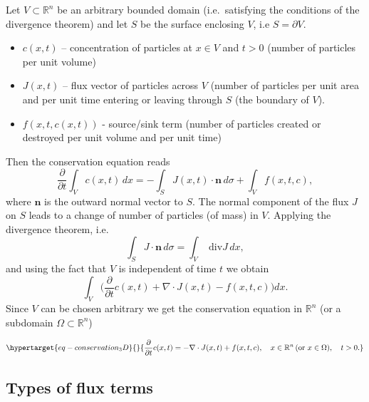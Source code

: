 \documentclass[
  letterpaper,
  DIV=11,
  numbers=noendperiod]{scrreprt}
\providecommand{\tightlist}{%
  \setlength{\itemsep}{0pt}\setlength{\parskip}{0pt}}\usepackage{longtable,booktabs,array}
\theoremstyle{plain}
\theoremstyle{definition}
\theoremstyle{plain}
\theoremstyle{remark}
\begin{document}
Let \(V \subset \mathbb R^n\) be an arbitrary bounded domain
(i.e.~satisfying the conditions of the divergence theorem) and let \(S\)
be the surface enclosing \(V\), i.e \(S = \partial V\).

\begin{itemize}
\tightlist
\item
  \(c(x,t)\) -- concentration of particles at \(x\in V\) and \(t>0\)
  (number of particles per unit volume)
\item
  \(J(x,t)\) -- flux vector of particles across \(V\) (number of
  particles per unit area and per unit time entering or leaving through
  \(S\) (the boundary of \(V\)).
\item
  \(f(x,t ,c(x,t))\) - source/sink term (number of particles created or
  destroyed per unit volume and per unit time)
\end{itemize}

Then the conservation equation reads \[
\frac{\partial}{\partial t} \int_V c(x,t) \, dx = - \int_{S} J(x,t) \cdot {\mathbf{n}} \, d\sigma + \int_V f(x,t ,c), 
\] where \(\mathbf{n}\) is the outward normal vector to \(S\). The
normal component of the flux \(J\) on \(S\) leads to a change of number
of particles (of mass) in \(V\). Applying the divergence theorem,
i.e.~\[
\int_S J \cdot {\mathbf{n}} \, d\sigma = \int_V \text{ div} J \, dx,
\] and using the fact that \(V\) is independent of time \(t\) we obtain
\[
 \int_V \Big(\frac{\partial}{\partial t} c(x,t) + \nabla \cdot  J(x,t) -  f(x,t ,c)\Big) dx.
\] Since \(V\) can be chosen arbitrary we get the conservation equation
in \(\mathbb R^n\) (or a subdomain \(\Omega \subset \mathbb R^n\))

\begin{equation}\protect\hypertarget{eq-conservation_3D}{}{
\frac{\partial}{\partial t} c(x,t) =  - \nabla \cdot  J(x,t)+  f(x,t ,c), \quad x\in \mathbb R^n \,  (\text{or } x \in \Omega), \quad t >0. 
}\label{eq-conservation_3D}\end{equation}

\hypertarget{types-of-flux-terms}{%
\subsection{Types of flux terms}\label{types-of-flux-terms}}
\end{document}
